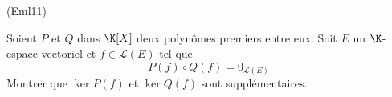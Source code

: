 \begin{tiny}(Eml11)\end{tiny} Soient $P$ et $Q$ dans $\K[X]$ deux polynômes premiers entre eux. Soit $E$ un $\K$-espace vectoriel et $f\in \mathcal L(E)$ tel que 
\begin{displaymath}
 P(f)\circ Q(f)=0_{\mathcal L(E)}
\end{displaymath}
 Montrer que $\ker P(f)$ et  $\ker Q(f)$ sont supplémentaires.
